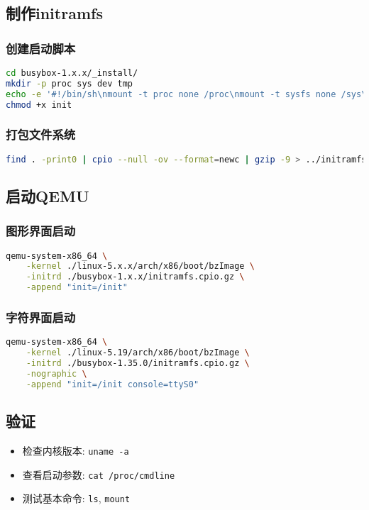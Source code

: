 \subsection{制作initramfs}
\subsubsection{创建启动脚本}
\begin{lstlisting}[language=bash]
cd busybox-1.x.x/_install/
mkdir -p proc sys dev tmp
echo -e '#!/bin/sh\nmount -t proc none /proc\nmount -t sysfs none /sys\nmount -t tmpfs none /tmp\nmount -t devtmpfs none /dev\necho "Hello Linux!"\nexec /bin/sh' > init
chmod +x init
\end{lstlisting}

\subsubsection{打包文件系统}
\begin{lstlisting}[language=bash]
find . -print0 | cpio --null -ov --format=newc | gzip -9 > ../initramfs.cpio.gz
\end{lstlisting}

\subsection{启动QEMU}
\subsubsection{图形界面启动}
\begin{lstlisting}[language=bash]
qemu-system-x86_64 \
    -kernel ./linux-5.x.x/arch/x86/boot/bzImage \
    -initrd ./busybox-1.x.x/initramfs.cpio.gz \
    -append "init=/init"
\end{lstlisting}

\subsubsection{字符界面启动}
\begin{lstlisting}[language=bash]
qemu-system-x86_64 \
    -kernel ./linux-5.19/arch/x86/boot/bzImage \
    -initrd ./busybox-1.35.0/initramfs.cpio.gz \
    -nographic \
    -append "init=/init console=ttyS0"
\end{lstlisting}

\subsection{验证}
\begin{itemize}
    \item 检查内核版本: \texttt{uname -a}
    \item 查看启动参数: \texttt{cat /proc/cmdline}
    \item 测试基本命令: \texttt{ls}, \texttt{mount}
\end{itemize}